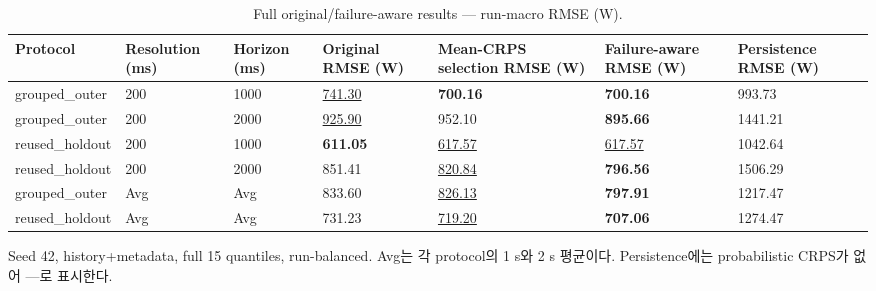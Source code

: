 \begin{table}[t]
\centering
\caption{Full original/failure-aware results — run-macro RMSE (W).}
\label{tab:a2f_failure_aware_rmse}
\small
\begin{tabular}{lllllll}
\toprule
Protocol & Resolution (ms) & Horizon (ms) & Original RMSE (W) & Mean-CRPS selection RMSE (W) & Failure-aware RMSE (W) & Persistence RMSE (W) \\
\midrule
grouped\_outer & 200 & 1000 & \underline{741.30} & \textbf{700.16} & \textbf{700.16} & 993.73 \\
grouped\_outer & 200 & 2000 & \underline{925.90} & 952.10 & \textbf{895.66} & 1441.21 \\
reused\_holdout & 200 & 1000 & \textbf{611.05} & \underline{617.57} & \underline{617.57} & 1042.64 \\
reused\_holdout & 200 & 2000 & 851.41 & \underline{820.84} & \textbf{796.56} & 1506.29 \\
grouped\_outer & Avg & Avg & 833.60 & \underline{826.13} & \textbf{797.91} & 1217.47 \\
reused\_holdout & Avg & Avg & 731.23 & \underline{719.20} & \textbf{707.06} & 1274.47 \\
\bottomrule
\end{tabular}
\vspace{2pt}\par\footnotesize Seed 42, history+metadata, full 15 quantiles, run-balanced. Avg는 각 protocol의 1 s와 2 s 평균이다. Persistence에는 probabilistic CRPS가 없어 —로 표시한다.
\end{table}
